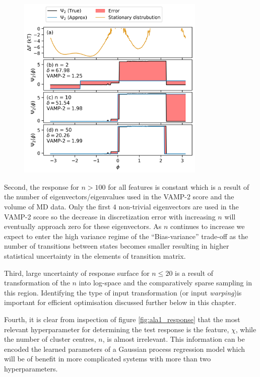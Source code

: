 \begin{figure}
    \centering
    \caption{}
    \label{fig:ala1_evcompare}
    \includegraphics[width=0.8\textwidth]{chapters/msm_optimization/figures/ala1_ev_n_compare.png}
\end{figure}

Second, the response for $n > 100$ for all features is constant which is a result of the number of eigenvectors/eigenvalues used in the VAMP-2 score and the volume of MD data. Only the first $4$ non-trivial eigenvectors are used in the VAMP-2 score so the decrease in discretization error with increasing $n$ will eventually approach zero for these eigenvectors. As $n$ continues to increase we expect to enter the high variance regime of the ``Bias-variance'' trade-off as the number of transitions between states becomes smaller resulting in higher statistical uncertainty in the elements of transition matrix. 

Third, large uncertainty of response surface for $n \leq 20$ is a result of transformation of the $n$ into log-space and the comparatively sparse sampling in this region. Identifying the type of input transformation (or input \emph{warping})is important for efficient optimisation \cite{snoekInputWarpingBayesian2014a} discussed further below in this chapter.

Fourth, it is clear from inspection of figure \ref{fig:ala1_response} that the most relevant hyperparameter for determining the test response is the feature, $\chi$, while the number of cluster centres,  $n$, is almost irrelevant. This information can be encoded the learned parameters of a Gaussian process regression model which will be of benefit in more complicated systems with more than two hyperparameters. 
 
